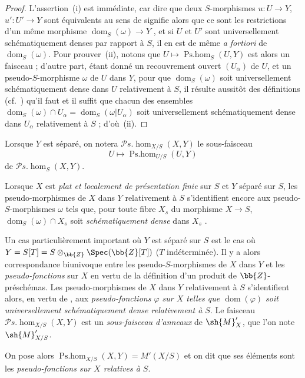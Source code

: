 \begin{proof}
L'assertion~(i) est immédiate, car dire que deux $S$-morphismes $u:U\to Y$, $u':U'\to Y$ sont équivalents au sens de  signifie alors que ce sont les restrictions d'un même morphisme $\operatorname{dom}_S(\omega)\to Y$ , et si $U$ et $U'$ sont universellement schématiquement denses par rapport à $S$, il en est de même \emph{a fortiori} de $\operatorname{dom}_S(\omega)$.
Pour prouver~(ii), notons que $U\mapsto\operatorname{Ps.hom}_S(U,Y)$ est alors un faisceau  ; d'autre part, étant donné un recouvrement ouvert $(U_\alpha)$ de $U$, et un pseudo-$S$-morphisme $\omega$ de $U$ dans $Y$, pour que $\operatorname{dom}_S(\omega)$ soit universellement schématiquement dense dans $U$ relativement à $S$, il résulte aussitôt des définitions (cf.\ ) qu'il faut et il suffit que chacun des ensembles $\operatorname{dom}_S(\omega)\cap U_\alpha=\operatorname{dom}_S(\omega|U_\alpha)$ soit universellement schématiquement dense dans $U_\alpha$ relativement à $S$ ; d'où~(ii).
\end{proof}

Lorsque $Y$ est séparé, on notera $\mathscr{P}\!s.\!\operatorname{hom}_{X/S}(X,Y)$ le sous-faisceau
\[
  U\mapsto\operatorname{Ps.hom}_{U/S}(U,Y)
\]
de $\mathscr{P}\!s.\!\operatorname{hom}_S(X,Y)$.

Lorsque $X$ est \emph{plat et localement de présentation finie} sur $S$ et $Y$ séparé sur $S$, les pseudo-morphismes de $X$ dans $Y$ relativement à $S$ s'identifient encore aux pseudo-$S$-morphismes $\omega$ tels que, pour toute fibre $X_s$ du morphisme $X\to S$, $\operatorname{dom}_S(\omega)\cap X_s$ soit \emph{schématiquement dense} dans $X_s$ .

\begin{env}[20.5.4]
\label{IV.20.5.4}
Un cas particulièrement important où $Y$ est séparé sur $S$ est le cas où $Y=S[T]=S\otimes_{\bb{Z}}\Spec(\bb{Z}[T])$ ($T$ indéterminée).
Il y a alors correspondance biunivoque entre les pseudo-$S$-morphismes de $X$ dans $Y$ et les \emph{pseudo-fonctions} sur $X$  en vertu de la définition d'un produit de $\bb{Z}$-préschémas.
Les pseudo-morphismes de $X$ dans $Y$ relativement à $S$ s'identifient alors, en vertu de , aux \emph{pseudo-fonctions $\varphi$ sur $X$ telles que $\operatorname{dom}(\varphi)$ soit universellement schématiquement dense relativement à $S$}.
Le faisceau $\mathscr{P}\!s.\!\operatorname{hom}_{X/S}(X,Y)$ est un \emph{sous-faisceau d'anneaux} de $\sh{M}'_X$, que l'on note $\sh{M}'_{X/S}$.

On pose alors $\operatorname{Ps.hom}_{X/S}(X,Y)=M'(X/S)$ et on dit que ses éléments sont les \emph{pseudo-fonctions sur $X$ relatives à $S$}.
\end{env}

